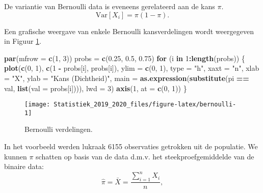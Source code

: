 \documentclass[12pt,dutch,coursenotes]{book}
\newenvironment{Shaded}{\begin{snugshade}}{\end{snugshade}}
\newcommand{\KeywordTok}[1]{\textcolor[rgb]{0.13,0.29,0.53}{\textbf{#1}}}
\newcommand{\DataTypeTok}[1]{\textcolor[rgb]{0.13,0.29,0.53}{#1}}
\newcommand{\DecValTok}[1]{\textcolor[rgb]{0.00,0.00,0.81}{#1}}
\newcommand{\FloatTok}[1]{\textcolor[rgb]{0.00,0.00,0.81}{#1}}
\newcommand{\StringTok}[1]{\textcolor[rgb]{0.31,0.60,0.02}{#1}}
\newcommand{\ControlFlowTok}[1]{\textcolor[rgb]{0.13,0.29,0.53}{\textbf{#1}}}
\newcommand{\OperatorTok}[1]{\textcolor[rgb]{0.81,0.36,0.00}{\textbf{#1}}}
\newcommand{\NormalTok}[1]{#1}
\theoremstyle{definition}
\theoremstyle{definition}
\theoremstyle{definition}
\theoremstyle{remark}
\begin{document}
De variantie van Bernoulli data is eveneens gerelateerd aan de kans
\(\pi\). \[\text{Var}[X_i]=\pi (1-\pi).\]

Een grafische weergave van enkele Bernoulli kansverdelingen wordt
weergegeven in Figuur \ref{fig:bernoulli}.

\begin{Shaded}
\begin{Highlighting}[]
\KeywordTok{par}\NormalTok{(}\DataTypeTok{mfrow =} \KeywordTok{c}\NormalTok{(}\DecValTok{1}\NormalTok{, }\DecValTok{3}\NormalTok{))}
\NormalTok{probs =}\StringTok{ }\KeywordTok{c}\NormalTok{(}\FloatTok{0.25}\NormalTok{, }\FloatTok{0.5}\NormalTok{, }\FloatTok{0.75}\NormalTok{)}
\ControlFlowTok{for}\NormalTok{ (i }\ControlFlowTok{in} \DecValTok{1}\OperatorTok{:}\KeywordTok{length}\NormalTok{(probs)) \{}
    \KeywordTok{plot}\NormalTok{(}\KeywordTok{c}\NormalTok{(}\DecValTok{0}\NormalTok{, }\DecValTok{1}\NormalTok{), }\KeywordTok{c}\NormalTok{(}\DecValTok{1} \OperatorTok{-}\StringTok{ }\NormalTok{probs[i], probs[i]), }\DataTypeTok{ylim =} \KeywordTok{c}\NormalTok{(}\DecValTok{0}\NormalTok{, }
        \DecValTok{1}\NormalTok{), }\DataTypeTok{type =} \StringTok{"h"}\NormalTok{, }\DataTypeTok{xaxt =} \StringTok{"n"}\NormalTok{, }\DataTypeTok{xlab =} \StringTok{"X"}\NormalTok{, }\DataTypeTok{ylab =} \StringTok{"Kans (Dichtheid)"}\NormalTok{, }
        \DataTypeTok{main =} \KeywordTok{as.expression}\NormalTok{(}\KeywordTok{substitute}\NormalTok{(pi }\OperatorTok{==}\StringTok{ }\NormalTok{val, }
            \KeywordTok{list}\NormalTok{(}\DataTypeTok{val =}\NormalTok{ probs[i]))), }\DataTypeTok{lwd =} \DecValTok{3}\NormalTok{)}
    \KeywordTok{axis}\NormalTok{(}\DecValTok{1}\NormalTok{, }\DataTypeTok{at =} \KeywordTok{c}\NormalTok{(}\DecValTok{0}\NormalTok{, }\DecValTok{1}\NormalTok{))}
\NormalTok{\}}
\end{Highlighting}
\end{Shaded}

\begin{figure}

{\centering \texttt{[image: Statistiek\_2019\_2020\_files/figure-latex/bernoulli-1]} 

}

\caption{Bernoulli verdelingen.}\label{fig:bernoulli}
\end{figure}

In het voorbeeld werden lukraak 6155 observaties getrokken uit de
populatie. We kunnen \(\pi\) schatten op basis van de data d.m.v. het
steekproefgemiddelde van de binaire data:
\[\hat \pi = \bar X = \frac{\sum\limits_{i=1}^n X_i}{n},\]
\end{document}
